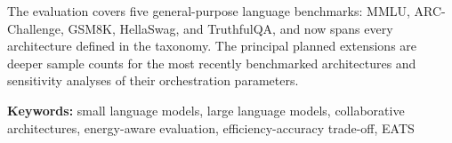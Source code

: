 The evaluation covers five general-purpose language benchmarks: MMLU, ARC-Challenge, GSM8K, HellaSwag, and TruthfulQA, and now spans every architecture defined in the taxonomy. The principal planned extensions are deeper sample counts for the most recently benchmarked architectures and sensitivity analyses of their orchestration parameters.

\vspace{0.5cm}

\noindent \textbf{Keywords:} small language models, large language models, collaborative architectures, energy-aware evaluation, efficiency-accuracy trade-off, EATS

